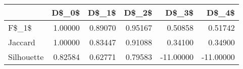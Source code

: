\begin{table}
\centering
\caption{}
\label{}
\begin{tabular}{lrrrrr}
\toprule
{} &   D\$\_0\$ &   D\$\_1\$ &   D\$\_2\$ &     D\$\_3\$ &     D\$\_4\$ \\
\midrule
F\$\_1\$      & 1.00000 & 0.89070 & 0.95167 &   0.50858 &   0.51742 \\
Jaccard    & 1.00000 & 0.83447 & 0.91088 &   0.34100 &   0.34900 \\
Silhouette & 0.82584 & 0.62771 & 0.79583 & -11.00000 & -11.00000 \\
\bottomrule
\end{tabular}
\end{table}
